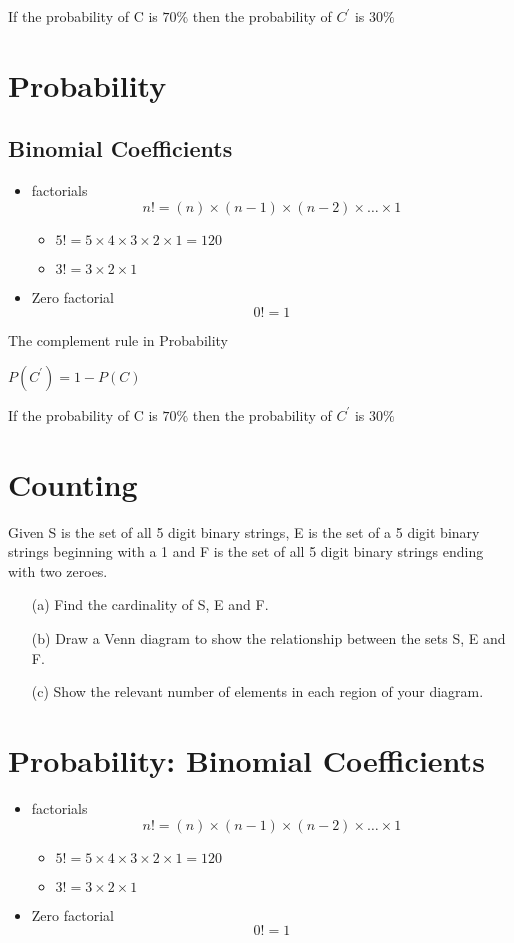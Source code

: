 \documentclass[]{report}
\begin{document}
If the probability of C is $70 \%$ then the probability of $C^{\prime}$ is $30\%$


\section*{Probability}
\subsection*{Binomial Coefficients}
\begin{itemize}
	\item factorials 
	\[ n! = (n)\times (n-1)\times(n-2) \times \ldots \times 1 \]
	\begin{itemize}
		\item $5! = 5 \times 4 \times 3 \times 2 \times 1 = 120 $
		\item $3! = 3 \times 2 \times 1$
	\end{itemize}
	\item Zero factorial
	\[ 0! =  1 \]
\end{itemize}


The complement rule in Probability

$P(C^{\prime}) = 1- P(C)$



If the probability of C is $70 \%$ then the probability of $C^{\prime}$ is $30\%$


\section{Counting}
Given S is the set of all 5 digit binary strings, E is the set of a 5 digit
binary strings beginning with a 1 and F is the set of all 5 digit binary strings ending
with two zeroes.
\begin{itemize}
	\item[(a)] Find the cardinality of S, E and F.
	\item[(b)] Draw a Venn diagram to show the relationship between the sets S, E and F.
	\item[(c)] Show the relevant number of elements in each region of your diagram.
\end{itemize}

\section*{Probability: Binomial Coefficients}
\begin{itemize}
	\item factorials 
	\[ n! = (n)\times (n-1)\times(n-2) \times \ldots \times 1 \]
	\begin{itemize}
		\item $5! = 5 \times 4 \times 3 \times 2 \times 1 = 120 $
		\item $3! = 3 \times 2 \times 1$
	\end{itemize}
	\item Zero factorial
	\[ 0! =  1 \]
\end{itemize}
\end{document}
